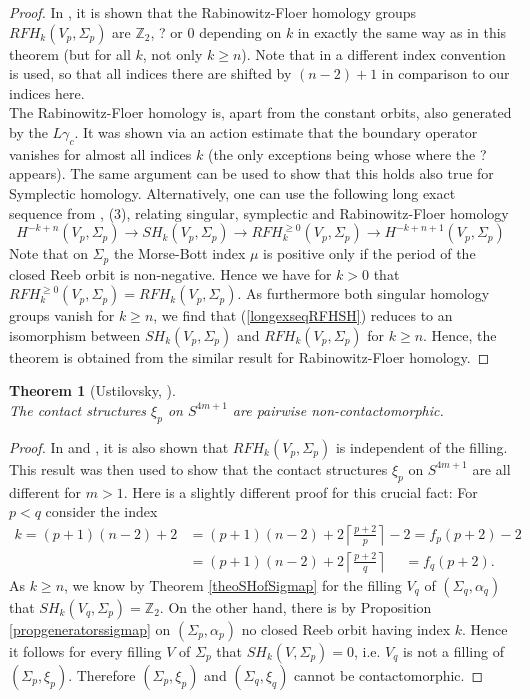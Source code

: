 \documentclass[a4paper,12pt,bibliography=totocnumbered,titlepage=false,abstracton,bookmarksnumbered=true]{scrartcl}
\newtheorem{theo}[defn]{Theorem}
\theoremstyle{definition}
\begin{document}
\begin{proof}
 In \cite{Fauck1}, it is shown that the Rabinowitz-Floer homology groups $RFH_k(V_p,\Sigma_p)$ are $\mathbb{Z}_2$, ? or $0$ depending on $k$ in exactly the same way as in this theorem (but for all $k$, not only $k\geq n$). Note that in \cite{Fauck1} a different index convention is used, so that all indices there are shifted by $(n{-}2)+1$ in comparison to our indices here.\\
 The Rabinowitz-Floer homology is, apart from the constant orbits, also generated by the $L\gamma_c$. It was shown via an action estimate that the boundary operator vanishes for almost all indices $k$ (the only exceptions being whose where the ? appears). The same argument can be used to show that this holds also true for Symplectic homology. Alternatively, one can use the following long exact sequence from \cite{FraCieOan}, (3), relating singular, symplectic and Rabinowitz-Floer homology
 \begin{equation}\label{longexseqRFHSH}
  H^{-k+n}(V_p,\Sigma_p)\rightarrow SH_k(V_p,\Sigma_p)\rightarrow RFH_k^{\geq 0}(V_p,\Sigma_p)\rightarrow H^{-k+n+1}(V_p,\Sigma_p)
 \end{equation}
 Note that on $\Sigma_p$ the Morse-Bott index $\mu$ is positive only if the period of the closed Reeb orbit is non-negative. Hence we have for $k>0$ that $RFH^{\geq 0}_k(V_p,\Sigma_p)=RFH_k(V_p,\Sigma_p)$. As furthermore both singular homology groups vanish for $k\geq n$, we find that (\ref{longexseqRFHSH}) reduces to an isomorphism between $SH_k(V_p,\Sigma_p)$ and $RFH_k(V_p,\Sigma_p)$ for $k\geq n$. Hence, the theorem is obtained from the similar result for Rabinowitz-Floer homology.
\end{proof}
\begin{theo}[Ustilovsky, \cite{Usti}]~\\
 The contact structures $\xi_p$ on $S^{4m+1}$ are pairwise non-contactomorphic.
\end{theo}
\begin{proof}
In \cite{Fauck1} and \cite{FauckThesis}, it is also shown that $RFH_k(V_p,\Sigma_p)$ is independent of the filling. This result was then used to show that the contact structures $\xi_p$ on $S^{4m+1}$ are all different for $m>1$. Here is a slightly different proof for this crucial fact: For $p<q$ consider the index
\begin{align*}
 k=(p{+}1)(n{-}2)+2&=(p{+}1)(n{-}2)+2\left\lceil{\textstyle\frac{p+2}{p}}\right\rceil{-}2 = f_p(p{+}2)-2\\
 &=(p{+}1)(n{-}2)+2\left\lceil{\textstyle\frac{p+2}{q}}\right\rceil \phantom{-2}= f_q(p{+}2).
\end{align*}
As $k\geq n$, we know by Theorem \ref{theoSHofSigmap} for the filling $V_q$ of $(\Sigma_q,\alpha_q)$ that $SH_k(V_q,\Sigma_p)=\mathbb{Z}_2$. On the other hand, there is by Proposition \ref{propgeneratorssigmap} on $(\Sigma_p,\alpha_p)$ no closed Reeb orbit having index $k$. Hence it follows for every filling $V$ of $\Sigma_p$ that $SH_k(V,\Sigma_p)=0$, i.e. $V_q$ is not a filling of $(\Sigma_p, \xi_p)$. Therefore $(\Sigma_p,\xi_p)$ and $(\Sigma_q,\xi_q)$ cannot be contactomorphic.
\end{proof}
\end{document}
